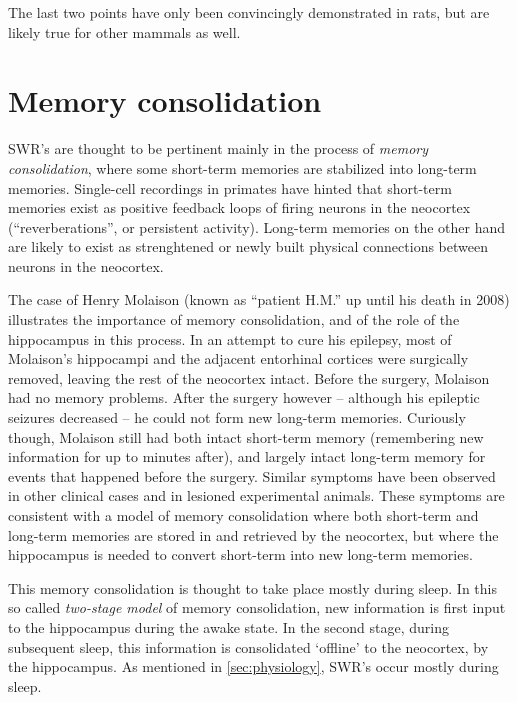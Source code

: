 The last two points have only been convincingly demonstrated in rats, but are likely true for other mammals as well.




\section{Memory consolidation}

SWR's are thought to be pertinent mainly in the process of \emph{memory consolidation}, where some short-term memories are stabilized into long-term memories. Single-cell recordings in primates have hinted that short-term memories exist as positive feedback loops of firing neurons in the neocortex (``reverberations'', or persistent activity). Long-term memories on the other hand are likely to exist as strenghtened or newly built physical connections between neurons in the neocortex. \cite{Kandel2013,Bear2015,Purves2017}

The case of Henry Molaison (known as ``patient H.M.'' up until his death in 2008) illustrates the importance of memory consolidation, and of the role of the hippocampus in this process. In an attempt to cure his epilepsy, most of Molaison's hippocampi and the adjacent entorhinal cortices were surgically removed, leaving the rest of the neocortex intact. Before the surgery, Molaison had no memory problems. After the surgery however -- although his epileptic seizures decreased -- he could not form new long-term memories.\footnotemark{} Curiously though, Molaison still had both intact short-term memory (remembering new information for up to minutes after), and largely intact long-term memory for events that happened before the surgery. Similar symptoms have been observed in other clinical cases and in lesioned experimental animals. These symptoms are consistent with a model of memory consolidation where both short-term and long-term memories are stored in and retrieved by the neocortex, but where the hippocampus is needed to convert short-term into new long-term memories. \cite{Kandel2013,Purves2017}


This memory consolidation is thought to take place mostly during sleep. In this so called \emph{two-stage model} of memory consolidation, new information is first input to the hippocampus during the awake state. In the second stage, during subsequent sleep, this information is consolidated `offline' to the neocortex, by the hippocampus. As mentioned in \cref{sec:physiology}, SWR's occur mostly during sleep.





